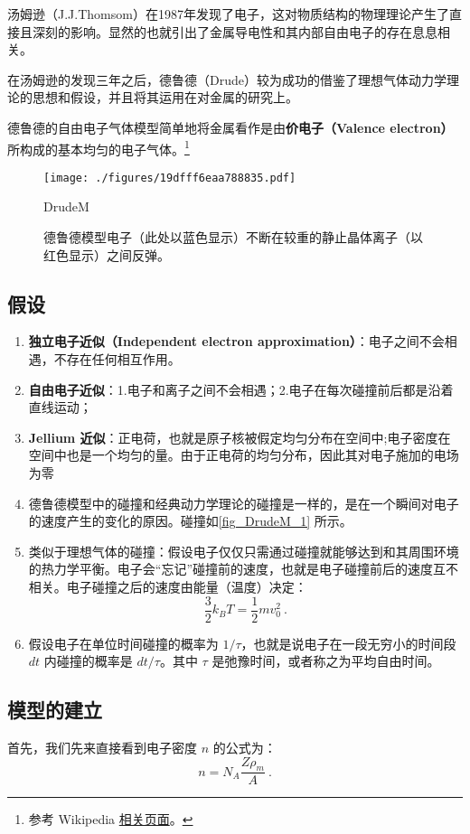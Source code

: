 
汤姆逊（J.J.Thomsom）在1987年发现了电子，这对物质结构的物理理论产生了直接且深刻的影响。显然的也就引出了金属导电性和其内部自由电子的存在息息相关。

在汤姆逊的发现三年之后，德鲁德（Drude）较为成功的借鉴了理想气体动力学理论的思想和假设，并且将其运用在对金属的研究上。

德鲁德的自由电子气体模型简单地将金属看作是由\textbf{价电子（Valence electron）}所构成的基本均匀的电子气体。\footnote{参考 Wikipedia \href{https://en.wikipedia.org/wiki/Drude_model}{相关页面}。}
\begin{figure}[ht]
\centering
\texttt{[image: ./figures/19dfff6eaa788835.pdf]}
\caption{德鲁德模型电子（此处以蓝色显示）不断在较重的静止晶体离子（以红色显示）之间反弹。} \label{fig_DrudeM_1}DrudeM
\end{figure}
\subsection{假设}
\begin{enumerate}
\item \textbf{独立电子近似（Independent electron approximation）}：电子之间不会相遇，不存在任何相互作用。
\item \textbf{自由电子近似}：1.电子和离子之间不会相遇；2.电子在每次碰撞前后都是沿着直线运动；
\item \textbf{Jellium 近似}：正电荷，也就是原子核被假定均匀分布在空间中;电子密度在空间中也是一个均匀的量。由于正电荷的均匀分布，因此其对电子施加的电场为零
\item 德鲁德模型中的碰撞和经典动力学理论的碰撞是一样的，是在一个瞬间对电子的速度产生的变化的原因。碰撞如\autoref{fig_DrudeM_1} 所示。
\item 类似于理想气体的碰撞：假设电子仅仅只需通过碰撞就能够达到和其周围环境的热力学平衡。电子会“忘记”碰撞前的速度，也就是电子碰撞前后的速度互不相关。电子碰撞之后的速度由能量（温度）决定：
\begin{equation}\label{eq_DrudeM_7}
\frac{3}{2}k_BT = \frac{1}{2}mv_0^2~.
\end{equation}
\item 假设电子在单位时间碰撞的概率为 $1/\tau $，也就是说电子在一段无穷小的时间段 $dt$ 内碰撞的概率是 $dt/\tau$。其中 $\tau$ 是弛豫时间，或者称之为平均自由时间。
\end{enumerate}
\subsection{模型的建立}
首先，我们先来直接看到电子密度 $n$ 的公式为：
\begin{equation}
n=N_A\frac{Z\rho_m}{A}~.
\end{equation}

